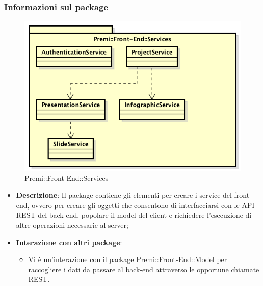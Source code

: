 \subsubsection{Informazioni sul package}
\begin{figure}[h]
	\centering
	\includegraphics[width=0.9\linewidth]{img/front-end_services}
	\caption[Premi::Front-End::Services]{Premi::Front-End::Services}
\end{figure}
\begin{itemize}
	\item \textbf{Descrizione}: Il package contiene gli elementi per creare i service del \gls{front-end}, ovvero per creare gli oggetti che consentono di interfacciarsi con le API \gls{REST} del \gls{back-end}, popolare il model del client e richiedere l'esecuzione di altre operazioni necessarie al server;
	\item \textbf{Interazione con altri package}:
	\begin{itemize}
		\item Vi è un'interazione con il package Premi::Front-End::Model per raccogliere i dati da passare al back-end attraverso le opportune chiamate REST.
	\end{itemize}
\end{itemize}

